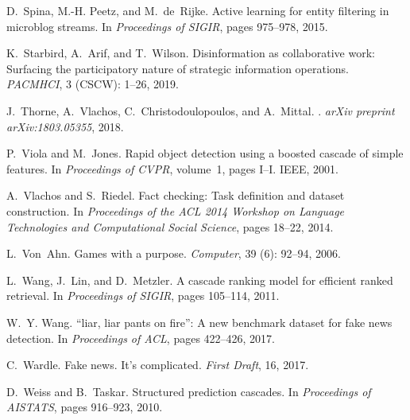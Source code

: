 \documentclass[11pt]{article}
\begin{document}
\begin{thebibliography}{10}
\begin{small}
D.~Spina, M.-H. Peetz, and M.~de~Rijke.
\newblock Active learning for entity filtering in microblog streams.
\newblock In \emph{Proceedings of SIGIR}, pages 975--978, 2015.

K.~Starbird, A.~Arif, and T.~Wilson.
\newblock Disinformation as collaborative work: Surfacing the participatory
nature of strategic information operations.
\newblock \emph{PACMHCI}, 3 (CSCW): 1--26, 2019.

J.~Thorne, A.~Vlachos, C.~Christodoulopoulos, and A.~Mittal.
.
\newblock \emph{arXiv preprint arXiv:1803.05355}, 2018.

P.~Viola and M.~Jones.
\newblock Rapid object detection using a boosted cascade of simple features.
\newblock In \emph{Proceedings of CVPR}, volume~1, pages I--I. IEEE, 2001.

A.~Vlachos and S.~Riedel.
\newblock Fact checking: Task definition and dataset construction.
\newblock In \emph{Proceedings of the ACL 2014 Workshop on Language
	Technologies and Computational Social Science}, pages 18--22, 2014.

L.~Von~Ahn.
\newblock Games with a purpose.
\newblock \emph{Computer}, 39 (6): 92--94, 2006.

L.~Wang, J.~Lin, and D.~Metzler.
\newblock A cascade ranking model for efficient ranked retrieval.
\newblock In \emph{Proceedings of SIGIR}, pages 105--114, 2011.

W.~Y. Wang.
\newblock “liar, liar pants on fire”: A new benchmark dataset for fake news
detection.
\newblock In \emph{Proceedings of ACL}, pages 422--426, 2017.

C.~Wardle.
\newblock Fake news. {I}t’s complicated.
\newblock \emph{First Draft}, 16, 2017.

D.~Weiss and B.~Taskar.
\newblock Structured prediction cascades.
\newblock In \emph{Proceedings of AISTATS}, pages 916--923, 2010.


\end{small}
\end{thebibliography}
\end{document}
